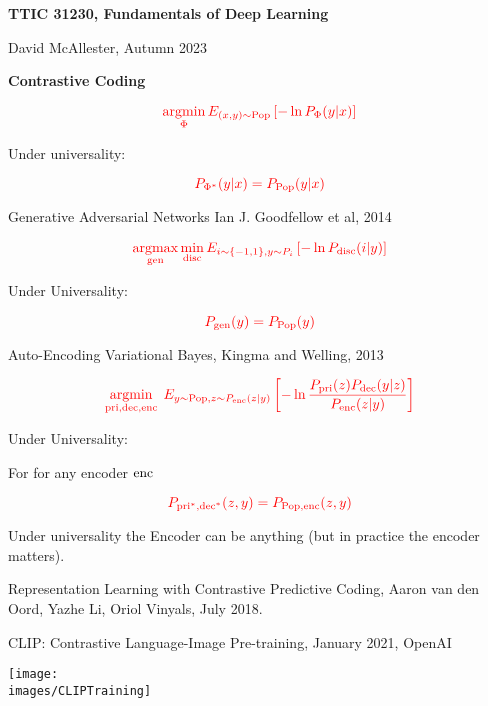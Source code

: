 





{\Huge
  \centerline{\bf TTIC 31230,  Fundamentals of Deep Learning}
  \vfill
  \centerline{David McAllester, Autumn   2023}
  \vfill
  \centerline{\bf Contrastive Coding}
  \vfill
  \vfill


$${\color{red} \operatorname*{argmin}_\Phi E_{(x,y)\sim \mathrm{Pop}}\left[-\ln P_\Phi(y|x)\right]}$$

\vfill
Under universality:

$${\color{red} P_{\Phi^*}(y|x) = P_{\mathrm{Pop}}(y|x)}$$


Generative Adversarial Networks
Ian J. Goodfellow et al, 2014

\vfill
$${\color{red} \operatorname*{argmax}_{\mathrm{gen}} \min_{\mathrm{disc}} E_{i \sim \{-1,1\}, y \sim P_i}\left[-\ln P_{\mathrm{disc}}(i|y)\right]}$$

\vfill
Under Universality:

\vfill
$${\color{red} P_{\mathrm{gen}}(y) = P_{\mathrm{Pop}}(y)}$$


Auto-Encoding Variational Bayes, Kingma and Welling, 2013

\vfill
$${\color{red} \operatorname*{argmin}_{\mathrm{pri},\mathrm{dec},\mathrm{enc}}\;E_{y \sim \mathrm{Pop},z \sim P_{\mathrm{enc}}(z|y)}\left[ - \ln \frac{P_{\mathrm{pri}}(z)P_{\mathrm{dec}}(y|z)}{P_{\mathrm{enc}}(z|y)}\right]}$$

\vfill
Under Universality:

\vfill
For for any encoder $\mathrm{enc}$

\vfill
$${\color{red} P_{\mathrm{pri}^*,\mathrm{dec}^*}(z,y) = P_{\mathrm{Pop},\mathrm{enc}}(z,y)}$$

\vfill
Under universality the Encoder can be anything (but in practice the encoder matters).


Representation Learning with Contrastive Predictive Coding,
Aaron van den Oord, Yazhe Li, Oriol Vinyals, July 2018.

\vfill
CLIP: Contrastive Language-Image Pre-training, January 2021, OpenAI




\centerline{\texttt{[image: \\images/CLIPTraining]}}


}
